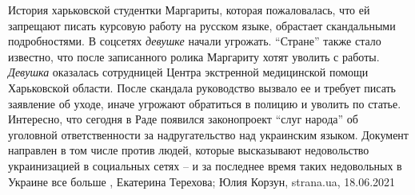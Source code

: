 История харьковской студентки Маргариты, которая пожаловалась, что ей запрещают
писать курсовую работу на русском языке, обрастает скандальными подробностями.
В соцсетях \emph{девушке} начали угрожать. \enquote{Стране} также стало известно, что после
записанного ролика Маргариту хотят уволить с работы.  \emph{Девушка} оказалась
сотрудницей Центра экстренной медицинской помощи Харьковской области. После
скандала руководство вызвало ее и требует писать заявление об уходе, иначе
угрожают обратиться в полицию и уволить по статье.  Интересно, что сегодня в
Раде появился законопроект \enquote{слуг народа} об уголовной ответственности за
надругательство над украинским языком. Документ направлен в том числе против
людей, которые высказывают недовольство украинизацией в социальных сетях – и за
последнее время таких недовольных в Украине все больше
, 
Екатерина Терехова; Юлия Корзун, strana.ua, 18.06.2021

